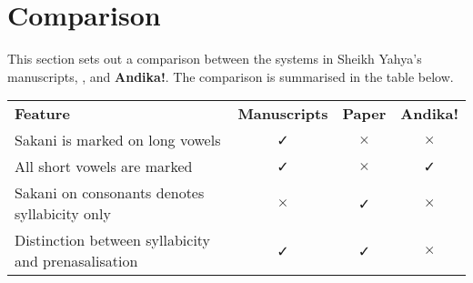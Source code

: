 \documentclass[a4paper,10pt, oneside]{book}
\newcommand\AS[1]{{\citationfont\RLE{#1}}}
\begin{document}
% 
% 
% 
% 
% 
% 
% 
% 
% 
% 
% 

\chapter{Comparison}
\label{ch:comparison}

This section sets out a comparison between the systems in Sheikh Yahya's manuscripts, \citet{Omar1997}, and \textbf{Andika!}. The comparison is summarised in the table below.

\begin{center}
\begin{tabular}{lccc}
\textbf{Feature} & \textbf{Manuscripts} & \textbf{Paper} & \textbf{Andika!} \\
\cline{1-4}\noalign{\medskip}
Sakani is marked on long vowels & ✓ & $\times$ & $\times$ \\
All short vowels are marked & ✓ & $\times$ & ✓ \\
Sakani on consonants denotes syllabicity only & $\times$ & ✓ & $\times$ \\
Distinction between syllabicity and prenasalisation & ✓ & ✓ & $\times$ \\
\end{tabular}
\end{center}
\end{document}
